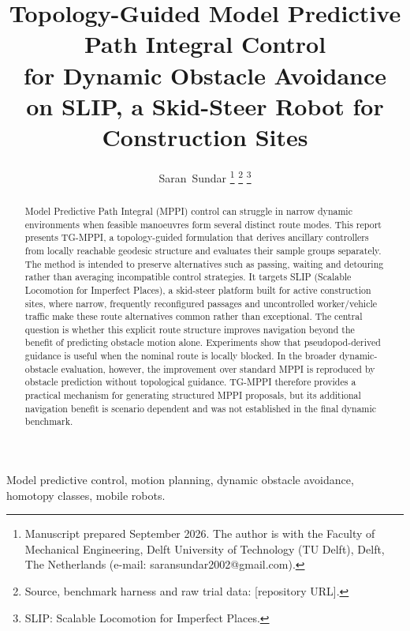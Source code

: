 \documentclass[journal]{IEEEtran}
\begin{document}
\title{Topology-Guided Model Predictive Path Integral Control\\
for Dynamic Obstacle Avoidance on SLIP, a Skid-Steer Robot for
Construction Sites}

\author{Saran~Sundar%
\thanks{Manuscript prepared September 2026. The author is with the Faculty
of Mechanical Engineering, Delft University of Technology (TU Delft), Delft,
The Netherlands (e-mail: saransundar2002@gmail.com).}%
\thanks{Source, benchmark harness and raw trial data: [repository URL].}%
\thanks{SLIP: Scalable Locomotion for Imperfect Places.}}


\maketitle

\begin{abstract}
Model Predictive Path Integral (MPPI) control can struggle in narrow dynamic
environments when feasible manoeuvres form several distinct route modes. This
report presents TG-MPPI, a topology-guided formulation that derives ancillary
controllers from locally reachable geodesic structure and evaluates their
sample groups separately. The method is intended to preserve alternatives such
as passing, waiting and detouring rather than averaging incompatible control
strategies. It targets SLIP (Scalable Locomotion for Imperfect Places), a
skid-steer platform built for active construction sites, where narrow,
frequently reconfigured passages and uncontrolled worker/vehicle traffic make
these route alternatives common rather than exceptional. The central question
is whether this explicit route structure improves navigation beyond the
benefit of predicting obstacle motion alone.
Experiments show that pseudopod-derived guidance is useful when the nominal
route is locally blocked. In the broader dynamic-obstacle evaluation, however,
the improvement over standard MPPI is reproduced by obstacle prediction
without topological guidance. TG-MPPI therefore provides a practical mechanism
for generating structured MPPI proposals, but its additional navigation
benefit is scenario dependent and was not established in the final dynamic
benchmark.
\end{abstract}

\begin{IEEEkeywords}
Model predictive control, motion planning, dynamic obstacle avoidance, homotopy
classes, mobile robots.
\end{IEEEkeywords}
\end{document}
